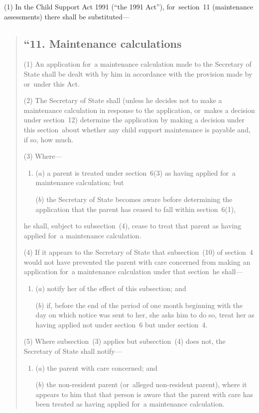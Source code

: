 \documentclass[12pt,a4paper]{article}
\begin{document}
(1) In the Child Support Act 1991 (“the 1991 Act”), for~section~11 (maintenance assessments) there shall be substituted—
\begin{quotation}
\subsection*{“11. Maintenance calculations}

(1) An application for~a maintenance calculation made to the Secretary of State shall be dealt with by him in accordance with the provision made by or~under this Act.

(2) The Secretary of State shall (unless he decides not to make a maintenance calculation in response to the application, or~makes a decision under section~12) determine the application by making a decision under this section~about whether any child support maintenance is payable and, if so, how much.

(3) Where—
\begin{enumerate}\item[]
($a$) a parent is treated under section~6(3)  as having applied for~a maintenance calculation; but

($b$) the Secretary of State becomes aware before determining the application that the parent has ceased to fall within section~6(1),
\end{enumerate}
he shall, subject to subsection~(4), cease to treat that parent as having applied for~a maintenance calculation.

(4) If it appears to the Secretary of State that subsection~(10)  of section~4 would not have prevented the parent with care concerned from making an application for~a maintenance calculation under that section~he shall—
\begin{enumerate}\item[]
($a$) notify her of the effect of this subsection; and

($b$) if, before the end of the period of one month beginning with the day on which notice was sent to her, she asks him to do so, treat her as having applied not under section~6 but under section~4. 
\end{enumerate}

(5) Where subsection~(3)  applies but subsection~(4)  does not, the Secretary of State shall notify—
\begin{enumerate}\item[]
($a$) the parent with care concerned; and

($b$) the non-resident parent (or~alleged non-resident parent), where it appears to him that that person is aware that the parent with care has been treated as having applied for~a maintenance calculation.
\end{enumerate}


\end{quotation}
\end{document}
